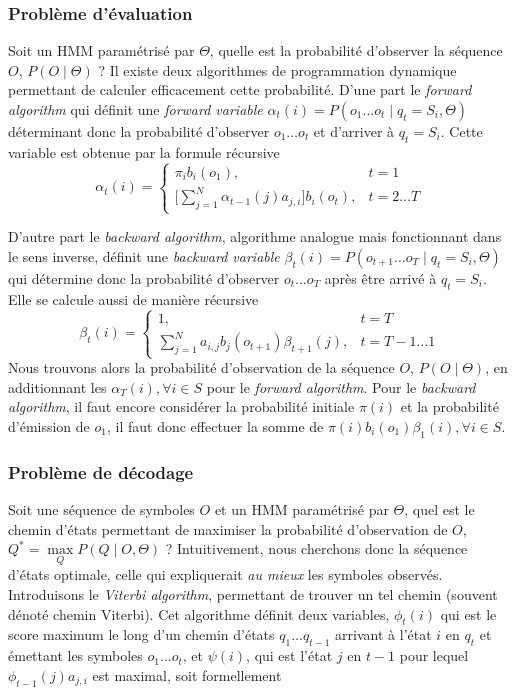 \documentclass[letterpaper]{article}
\begin{document}
\subsubsection{Problème d'évaluation} Soit un HMM paramétrisé par $\Theta$, quelle est la probabilité d'observer la séquence $O$, $P(O \mid \Theta)$ ? Il existe deux algorithmes de programmation dynamique permettant de calculer efficacement cette probabilité. D'une part le \textit{forward algorithm} qui définit une \textit{forward variable} $\alpha_t(i) = P(o_1\dots o_t \mid q_t = S_i, \Theta)$ déterminant donc la probabilité d'observer $o_1\dots o_t$ et d'arriver à $q_t =  S_i$. Cette variable est obtenue par la formule récursive 
\begin{equation} \label{eq:forward} %
\alpha_t(i) = \begin{cases}
		\pi_i b_i(o_1), & t=1 \\ 
		\Big[ \sum_{j=1}^{N}\alpha_{t-1}(j)a_{j,i} \Big] b_i(o_t), & t=2\dots T
\end{cases}
\end{equation}

D'autre part le \textit{backward algorithm}, algorithme analogue mais fonctionnant dans le sens inverse, définit une \textit{backward variable} $\beta_t(i) = P(o_{t+1}\dots o_T \mid q_t = S_i, \Theta)$ qui détermine donc la probabilité d'observer $o_t\dots o_T$ après être arrivé à $q_t =  S_i$. Elle se calcule aussi de manière récursive
\begin{equation} \label{eq:backward} %
\beta_t(i) = \begin{cases}
		1, & t=T \\ 
		\sum_{j=1}^{N} a_{i,j} b_j(o_{t+1}) \beta_{t+1}(j) , & t=T-1\dots 1
\end{cases}
\end{equation}
Nous trouvons alors la probabilité d'observation de la séquence $O$, $P(O \mid \Theta)$, en additionnant les $\alpha_T(i), \forall i \in S$ pour le \textit{forward algorithm}. Pour le \textit{backward algorithm}, il faut encore considérer la probabilité initiale $\pi(i)$ et la probabilité d'émission de $o_1$, il faut donc effectuer la somme de $\pi(i) b_i(o_1) \beta_1(i), \forall i \in S$.

\subsubsection{Problème de décodage}
Soit une séquence de symboles $O$ et un HMM paramétrisé par $\Theta$, quel est le chemin d'états permettant de maximiser la probabilité d'observation de $O$, $Q^* = \max\limits_{Q} P(Q \mid O, \Theta) $ ? Intuitivement, nous cherchons donc la séquence d'états optimale, celle qui expliquerait \textit{au mieux} les symboles observés. Introduisons le \textit{Viterbi algorithm}, permettant de trouver un tel chemin (souvent dénoté chemin Viterbi). Cet algorithme définit deux variables, $\phi_t(i)$ qui est le score maximum le long d'un chemin d'états $q_1 \dots q_{t-1}$ arrivant à l'état $i$ en $q_t$ et émettant les symboles $o_1\dots o_t$, et $\psi(i)$, qui est l'état $j$ en $t-1$ pour lequel $\phi_{t-1}(j)a_{j,i}$ est maximal, soit formellement
\end{document}
